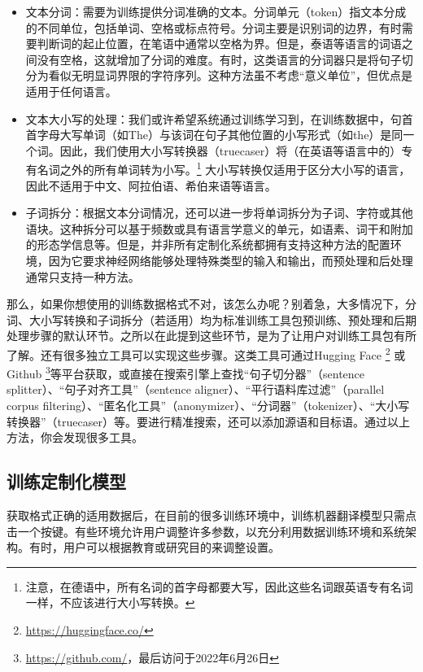 \documentclass[output=paper]{langscibook}
\begin{document}
\begin{itemize}\sloppy
\item 文本分词：需要为训练提供分词准确的文本。分词单元（token）指文本分成的不同单位，包括单词、空格或标点符号。分词主要是识别词的边界，有时需要判断词的起止位置，在笔语中通常以空格为界。但是，泰语等语言的词语之间没有空格，这就增加了分词的难度。有时，这类语言的分词器只是将句子切分为看似无明显词界限的字符序列。这种方法虽不考虑“意义单位”，但优点是适用于任何语言。

\item 文本大小写的处理：我们或许希望系统通过训练学习到，在训练数据中，句首首字母大写单词（如The）与该词在句子其他位置的小写形式（如the）是同一个词。因此，我们使用大小写转换器（truecaser）将（在英语等语言中的）专有名词之外的所有单词转为小写。\footnote{注意，在德语中，所有名词的首字母都要大写，因此这些名词跟英语专有名词一样，不应该进行大小写转换。} 大小写转换仅适用于区分大小写的语言，因此不适用于中文、阿拉伯语、希伯来语等语言。

\item 子词拆分：根据文本分词情况，还可以进一步将单词拆分为子词、字符或其他语块。这种拆分可以基于频数或具有语言学意义的单元，如语素、词干和附加的形态学信息等。但是，并非所有定制化系统都拥有支持这种方法的配置环境，因为它要求神经网络能够处理特殊类型的输入和输出，而预处理和后处理通常只支持一种方法。
\end{itemize}

那么，如果你想使用的训练数据格式不对，该怎么办呢？别着急，大多情况下，分词、大小写转换和子词拆分（若适用）均为标准训练工具包预训练、预处理和后期处理步骤的默认环节。之所以在此提到这些环节，是为了让用户对训练工具包有所了解。还有很多独立工具可以实现这些步骤。这类工具可通过Hugging Face \footnote{\url{https://huggingface.co/}} 或Github \footnote{\url{https://github.com/}，最后访问于2022年6月26日}等平台获取，或直接在搜索引擎上查找“句子切分器”（sentence splitter）、“句子对齐工具”（sentence aligner）、“平行语料库过滤”（parallel corpus filtering）、“匿名化工具”（anonymizer）、“分词器”（tokenizer）、“大小写转换器”（truecaser）等。要进行精准搜索，还可以添加源语和目标语。通过以上方法，你会发现很多工具。


\subsection{训练定制化模型}\largerpage

获取格式正确的适用数据后，在目前的很多训练环境中，训练机器翻译模型只需点击一个按键。有些环境允许用户调整许多参数，以充分利用数据训练环境和系统架构。有时，用户可以根据教育或研究目的来调整设置。
\end{document}
